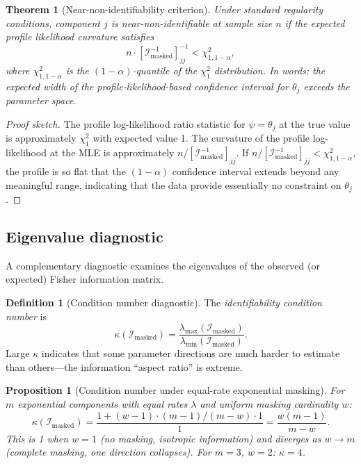 \documentclass[11pt]{article}
\theoremstyle{definition}
\newtheorem{definition}{Definition}
\theoremstyle{plain}
\newtheorem{theorem}{Theorem}
\newtheorem{proposition}{Proposition}
\newcommand{\FI}{\mathcal{I}}       %
\begin{document}
\begin{theorem}[Near-non-identifiability criterion]
\label{thm:near-nonid}
Under standard regularity conditions, component $j$ is
\emph{near-non-identifiable} at sample size $n$ if the
expected profile likelihood curvature satisfies
\begin{equation}
\label{eq:near-nonid}
    n \cdot [\FI_{\mathrm{masked}}^{-1}]_{jj}^{-1}
    < \chi^2_{1,1-\alpha},
\end{equation}
where $\chi^2_{1,1-\alpha}$ is the $(1-\alpha)$-quantile of the
$\chi^2_1$ distribution.
In words: the expected width of the profile-likelihood-based
confidence interval for $\theta_j$ exceeds the parameter space.
\end{theorem}

\begin{proof}[Proof sketch]
The profile log-likelihood ratio statistic for $\psi = \theta_j$ at
the true value is approximately $\chi^2_1$ with expected value 1.
The curvature of the profile log-likelihood at the MLE is approximately
$n / [\FI_{\mathrm{masked}}^{-1}]_{jj}$.
If $n / [\FI_{\mathrm{masked}}^{-1}]_{jj} < \chi^2_{1,1-\alpha}$,
the profile is so flat that the $(1-\alpha)$ confidence interval
extends beyond any meaningful range, indicating that the data
provide essentially no constraint on $\theta_j$.
\end{proof}

\subsection{Eigenvalue diagnostic}

A complementary diagnostic examines the eigenvalues of the observed
(or expected) Fisher information matrix.

\begin{definition}[Condition number diagnostic]
\label{def:condition-diagnostic}
The \emph{identifiability condition number} is
\begin{equation}
    \kappa(\FI_{\mathrm{masked}})
    = \frac{\lambda_{\max}(\FI_{\mathrm{masked}})}
           {\lambda_{\min}(\FI_{\mathrm{masked}})}.
\end{equation}
Large $\kappa$ indicates that some parameter directions are much
harder to estimate than others---the information ``aspect ratio''
is extreme.
\end{definition}

\begin{proposition}[Condition number under equal-rate exponential masking]
\label{prop:condition-expo}
For $m$ exponential components with equal rates $\lambda$ and
uniform masking cardinality $w$:
\begin{equation}
    \kappa(\FI_{\mathrm{masked}})
    = \frac{1 + (w-1) \cdot (m-1)/(m-w) \cdot 1}{1}
    = \frac{w(m-1)}{m - w}.
\end{equation}
This is 1 when $w = 1$ (no masking, isotropic information) and
diverges as $w \to m$ (complete masking, one direction collapses).
For $m = 3$, $w = 2$: $\kappa = 4$.
\end{proposition}
\end{document}
